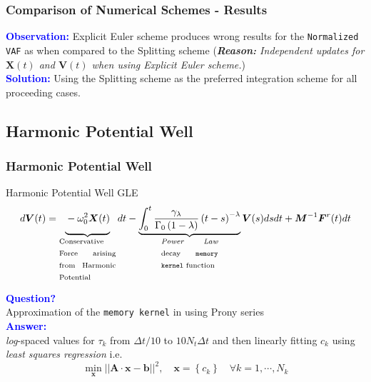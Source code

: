 \documentclass[a4paper,10pt]{beamer}
\newcommand{\BS}[1]{\boldsymbol{#1}}
\newcommand{\rb}[1]{\left( #1 \right)}
\newcommand{\norm}[1]{\left| \left| #1 \right| \right|}
\begin{document}
	\begin{frame}
		\frametitle{Comparison of Numerical Schemes - Results}
		\large
		\textcolor{blue}{\textbf{Observation:}}
		{Explicit Euler scheme produces wrong results for the \texttt{Normalized VAF} as when compared to the Splitting scheme} (\textit{\textbf{Reason:} Independent updates for $\BS{X}(t)$ and $\BS{V}(t)$ when using Explicit Euler scheme.}) \\
		\vspace{0.25cm}
		\textcolor{blue}{\textbf{Solution:}}
		{Using the Splitting scheme as the preferred integration scheme for all proceeding cases.}
	\end{frame}
	
	\begin{frame}
		\subsection{Harmonic Potential Well}
		\frametitle{Harmonic Potential Well}
		\begin{block}{Harmonic Potential Well GLE}
			\footnotesize
			\begin{align}
				d\BS{V}(t) = \underbrace{\vphantom{\int_{0}^{t} \frac{\gamma_{\lambda}}{\Gamma_{0} \rb{1-\lambda}}\rb{t-s}^{-\lambda} \BS{V}(s) ds dt} -\omega^{2}_{0} \BS{X}(t)}_{\text{\begin{minipage}{0.165\linewidth}
						Conservative Force arising from Harmonic Potential
						\end{minipage}}}dt - \underbrace{\int_{0}^{t} \frac{\gamma_{\lambda}}{\Gamma_{0} \rb{1-\lambda}}\rb{t-s}^{-\lambda}}_{\text{\begin{minipage}{0.165\linewidth}
						\textit{Power Law} decay \texttt{memory kernel} function
						\end{minipage}}} \BS{V}(s) ds dt + \BS{M}^{-1} \BS{F}^{r}(t) dt
						\label{eq:HarmonicGLE}
			\end{align}
		\end{block}
		\textcolor{blue}{\textbf{Question?}} \\ Approximation of the \texttt{memory kernel} in  using Prony series \\
		\textcolor{blue}{\textbf{Answer:}} \\
		\textit{log}-spaced values for $\tau_{k}$ from $\Delta t/10$ to $10N_{t}\Delta t$ and then linearly fitting $c_{k}$ using \textit{least squares regression} i.e. $$\min_{\BS{x}} \norm{\BS{A}\cdot \BS{x}-\BS{b}}^{2}, \quad \BS{x} = \left\{ c_{k} \right\} \quad \forall
		 k=1, \cdots, N_{k}$$
	\end{frame}
\end{document}
